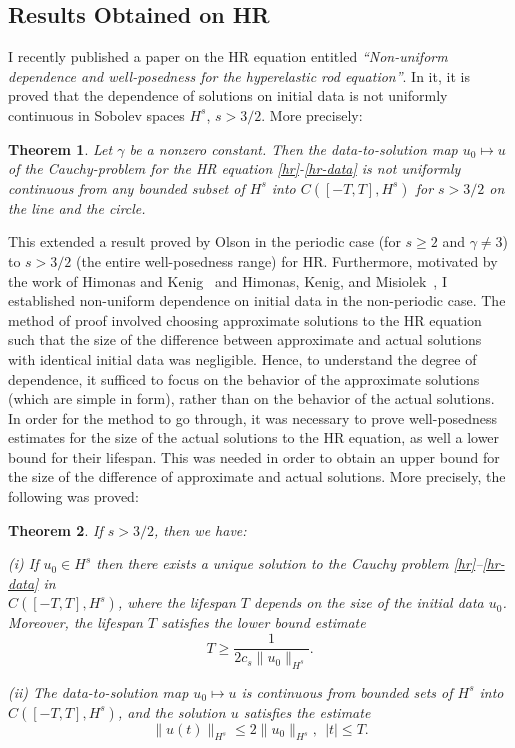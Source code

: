 \documentclass[12pt,reqno]{amsart}
\newtheorem{theorem}{Theorem}
\begin{document}
%
%
\subsection{Results Obtained on HR} 
\label{ssec:weak-disp}
%
%
%
%
%
%
%
%
%
%
I recently published a paper on the HR equation entitled 
{\it ``Non-uniform dependence and well-posedness for the hyperelastic rod equation''}. 
In it, it is proved that the dependence of
solutions on initial data is not uniformly continuous in Sobolev spaces
$H^s$, $s>3/2$.  More precisely: 
\begin{theorem}
\label{hr-non-unif-dependence}
Let $\gamma$ be a nonzero constant. Then 
the data-to-solution map $u_{0} \mapsto u$ of the Cauchy-problem
for the HR equation
\eqref{hr}-\eqref{hr-data}
is not uniformly continuous
from any bounded subset of  $H^s$ into $C([-T, T], H^s)$
for $s>3/2$ on the line and the circle.
%
\end{theorem}
%
This extended a result proved by Olson \cite{Olson_2006_Non-uniform-dep} in the
periodic case (for $s\ge 2$ and $\gamma \ne 3$)  to  $s>3/2$ (the entire
well-posedness range) for HR\@. Furthermore, motivated by the work of Himonas
and Kenig~\cite{Himonas:2009fk} and Himonas, Kenig, and
Misiolek~\cite{Himonas:2010ch}, I established non-uniform dependence on initial
data in the non-periodic case.  The method of proof involved choosing
approximate solutions to the HR equation
such that the size of the difference between approximate and actual solutions
with identical initial data was negligible. Hence, to understand the degree of
dependence, it sufficed to focus on the behavior of the approximate solutions
(which are simple in form), rather than on the behavior of the actual solutions.
In order for the method to go through, it was necessary to prove well-posedness estimates
for the size of the actual solutions to the HR equation, as well a lower bound
for their lifespan. This was needed in order to obtain an upper bound for the
size of the difference of approximate and actual solutions. More precisely, 
the following was proved: 
%
\begin{theorem}
\label{thm:HR_existence_continuous_dependence}
If   $s>3/2$,  then we have:

(i) If $u_0\in H^s$ then there exists a unique solution to
the Cauchy problem  \eqref{hr}--\eqref{hr-data} in \\ $C([-T, T], H^s)$, where 
the lifespan $T$ depends on the size
of the initial data $u_0$. Moreover, 
the lifespan $T$ satisfies the lower bound estimate 
%
%
%
\begin{equation}
\label{Life-span-est}
T
\ge
\frac{1}{2c_s \|u_0\|_{H^s}}.
\end{equation}
%

(ii)
The data-to-solution map $u_0 \mapsto u$ is continuous from
bounded sets of $H^s$ into \\ $C([-T, T], H^s)$,
and the solution $u$ satisfies the estimate
%
%
%
\begin{equation}
\label{u_x-Linfty-Hs}
\|
u(t)
\|_ {H^s}
\le
2
\|
u_0
\|_{H^s}, \ \ |t|\le T.
\end{equation}
%
%
%
\end{theorem}
\end{document}

